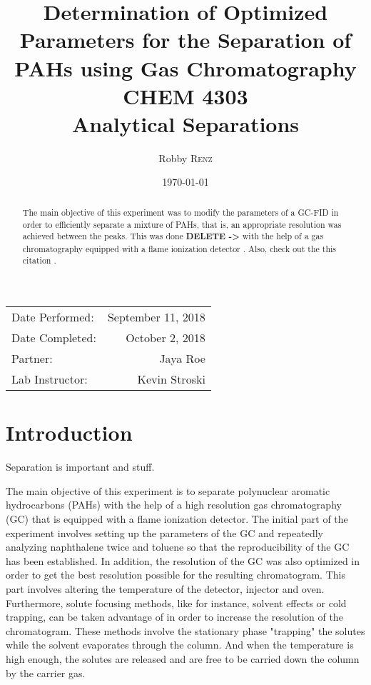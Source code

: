\documentclass[a4paper, 12pt]{article}
\title{Determination of Optimized Parameters for the Separation of PAHs using Gas Chromatography \\ CHEM 4303 \\ Analytical Separations} %
\author{Robby \textsc{Renz}} %
\date{\today} %
\begin{document}
\maketitle %

\begin{center}
\begin{tabular}{l r}
Date Performed: & September 11, 2018 \\ %
Date Completed: & October 2, 2018 \\
Partner: & Jaya Roe \\ %
Lab Instructor: & Kevin Stroski %
\end{tabular}
\end{center}


\begin{abstract}
	The main objective of this experiment was to modify the parameters of a GC-FID in order to efficiently separate a mixture of PAHs, that is, an appropriate resolution was achieved between the peaks. This was done \textbf{DELETE ->} with the help of a gas chromatography equipped with a flame ionization detector \cite{harris_quantitative_2010}. Also, check out the this citation \cite{pah-in-soil}.

\end{abstract}

\newpage


\section{Introduction}
Separation is important and stuff.

The main objective of this experiment is to separate polynuclear aromatic hydrocarbons (PAHs) with the help of a high resolution gas chromatography (GC) that is equipped with a flame ionization detector. The initial part of the experiment involves setting up the parameters of the GC and repeatedly analyzing naphthalene twice and toluene so that the reproducibility of the GC has been established. In addition, the resolution of the GC was also optimized in order to get the best resolution possible for the resulting chromatogram. This part involves altering the temperature of the detector, injector and oven. Furthermore, solute focusing methods, like for instance, solvent effects or cold trapping, can be taken advantage of in order to increase the resolution of the chromatogram. These methods involve the stationary phase "trapping" the solutes while the solvent evaporates through the column. And when the temperature is high enough, the solutes are released and are free to be carried down the column by the carrier gas.
\end{document}
